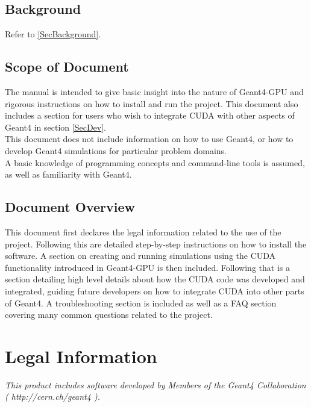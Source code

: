 \documentclass[12pt]{article}
\begin{document}
\subsection{Background} %
Refer to \ref{SecBackground}.

\subsection{Scope of Document} %
The manual is intended to give basic insight into the nature of Geant4-GPU and rigorous instructions on how to install and run the project. This document also includes a section for users who wish to integrate CUDA with other aspects of Geant4 in section \ref{SecDev}.\\

This document does not include information on how to use Geant4, or how to develop Geant4 simulations for particular problem domains.\\

A basic knowledge of programming concepts and command-line tools is assumed, as well as familiarity with Geant4.

\subsection{Document Overview} %
This document first declares the legal information related to the use of the project. Following this are detailed step-by-step instructions on how to install the software. A section on creating and running simulations using the CUDA functionality introduced in Geant4-GPU is then included. Following that is a section detailing high level details about how the CUDA code was developed and integrated, guiding future developers on how to integrate CUDA into other parts of Geant4. A troubleshooting section is included as well as a FAQ section covering many common questions related to the project.

\section{Legal Information}	%
\emph{This product includes software developed by Members of the Geant4 Collaboration ( http://cern.ch/geant4 ).}
\end{document}
